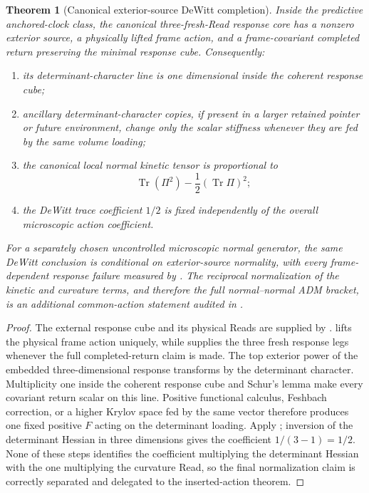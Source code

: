 \documentclass[11pt]{article}
\newtheorem{theorem}{Theorem}[section]
\theoremstyle{definition}
\theoremstyle{remark}
\newcommand{\Tr}{\operatorname{Tr}}
\begin{document}
\begin{theorem}[Canonical exterior-source DeWitt completion]
\label{thm:canonical-ADM-master}
Inside the predictive anchored-clock class, the canonical three-fresh-Read
response core has a nonzero exterior source, a physically lifted frame action,
and a frame-covariant completed return preserving the minimal response cube.
Consequently:
\begin{enumerate}[label=\textup{(\roman*)},leftmargin=2.7em]
\item its determinant-character line is one dimensional inside the coherent
      response cube;
\item ancillary determinant-character copies, if present in a larger retained
      pointer or future environment, change only the scalar stiffness whenever
      they are fed by the same volume loading;
\item the canonical local normal kinetic tensor is proportional to
      \[
        \Tr(\Pi^2)-\frac12(\Tr\Pi)^2;
      \]
\item the DeWitt trace coefficient $1/2$ is fixed independently of the overall
      microscopic action coefficient.
\end{enumerate}
For a separately chosen uncontrolled microscopic normal generator, the same
DeWitt conclusion is conditional on exterior-source normality, with every
frame-dependent response failure measured by
.  The reciprocal normalization of the
kinetic and curvature terms, and therefore the full normal--normal ADM bracket,
is an additional common-action statement audited in
.
\end{theorem}

\begin{proof}
The external response cube and its physical Reads are supplied by
.
 lifts the physical frame action
uniquely, while  supplies the three
fresh response legs whenever the full completed-return claim is made.  The top
exterior power of the embedded three-dimensional response transforms by the
determinant character.  Multiplicity one inside the coherent response cube and
Schur's lemma make every covariant return scalar on this line.  Positive
functional calculus, Feshbach correction, or a higher Krylov space fed by the
same vector therefore produces one fixed positive $F$ acting on the determinant
loading.  Apply ; inversion of the
determinant Hessian in three dimensions gives the coefficient $1/(3-1)=1/2$.
None of these steps identifies the coefficient multiplying the determinant
Hessian with the one multiplying the curvature Read, so the final normalization
claim is correctly separated and delegated to the inserted-action theorem.
\end{proof}
\end{document}
